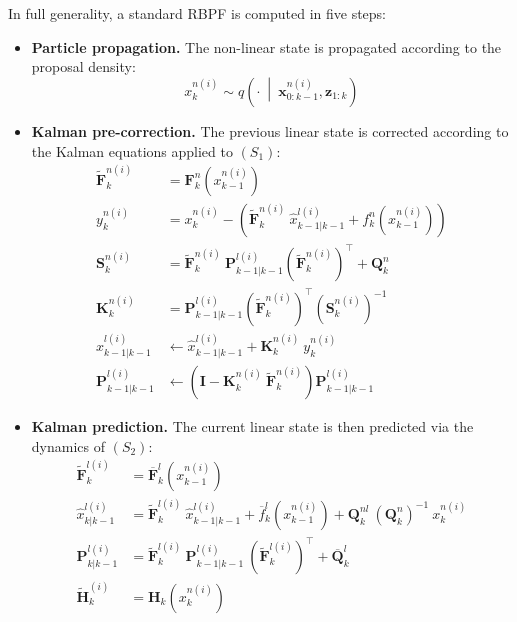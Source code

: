 In full generality, a standard RBPF is computed in five steps:
\begin{itemize}
	\item\textbf{Particle propagation.} The non-linear state is propagated according to the proposal density:
	\begin{equation}
		x_k^{n(i)}\sim q\left(\cdot\:\middle|\:\mathbf{x}_{0:k-1}^{n(i)},\mathbf{z}_{1:k}\right)\label{eq:RBPF_propagation}
	\end{equation}
	\item\textbf{Kalman pre-correction.} The previous linear state is corrected according to the Kalman equations applied to $(S_1)$:
	\begin{align}
		\tilde{\mathbf{F}}_k^{n(i)}&=\mathbf{F}_k^n\left(x_{k-1}^{n(i)}\right)\label{eq:RBPF_precorrection_debut}\\
		y_k^{n(i)}&=x_k^{n(i)}-\left(\tilde{\mathbf{F}}_k^{n(i)}\:\hat{x}_{k-1|k-1}^{l(i)}+f_k^n\left(x_{k-1}^{n(i)}\right)\right)\\
		\mathbf{S}_k^{n(i)}&=\tilde{\mathbf{F}}_k^{n(i)}\:\mathbf{P}_{k-1|k-1}^{l(i)}\left(\tilde{\mathbf{F}}_k^{n(i)}\right)^\top+\mathbf{Q}_k^n\\
		\mathbf{K}_k^{n(i)}&=\mathbf{P}_{k-1|k-1}^{l(i)}\left(\tilde{\mathbf{F}}_k^{n(i)}\right)^\top\left(\mathbf{S}_k^{n(i)}\right)^{-1}\\
		\hat{x}_{k-1|k-1}^{l(i)}&\gets\hat{x}_{k-1|k-1}^{l(i)}+\mathbf{K}_k^{n(i)}\:y_k^{n(i)}\\
		\mathbf{P}_{k-1|k-1}^{l(i)}&\gets\left(\mathbf{I}-\mathbf{K}_k^{n(i)}\:\tilde{\mathbf{F}}_k^{n(i)}\right)\mathbf{P}_{k-1|k-1}^{l(i)}\label{eq:RBPF_precorrection_fin}
	\end{align}
	\item\textbf{Kalman prediction.} The current linear state is then predicted via the dynamics of $(S_2)$:
	\begin{align}
		\tilde{\mathbf{F}}_k^{l(i)}&=\overline{\mathbf{F}}_k^l\left(x_{k-1}^{n(i)}\right)\label{eq:RBPF_prediction_debut}\\
		\hat{x}_{k|k-1}^{l(i)}&=\tilde{\mathbf{F}}_k^{l(i)}\:\hat{x}_{k-1|k-1}^{l(i)}+\overline{f}_k^l\left(x_{k-1}^{n(i)}\right)+\mathbf{Q}_k^{nl}\:(\mathbf{Q}_k^n)^{-1}\:x_k^{n(i)}\\
		\mathbf{P}_{k|k-1}^{l(i)}&=\tilde{\mathbf{F}}_k^{l(i)}\:\mathbf{P}_{k-1|k-1}^{l(i)}\:\left(\tilde{\mathbf{F}}_k^{l(i)}\right)^\top+\overline{\mathbf{Q}}_k^l\\
		\tilde{\mathbf{H}}_k^{(i)}&=\mathbf{H}_k\left(x_k^{n(i)}\right)\\

\end{align}
\end{itemize}
